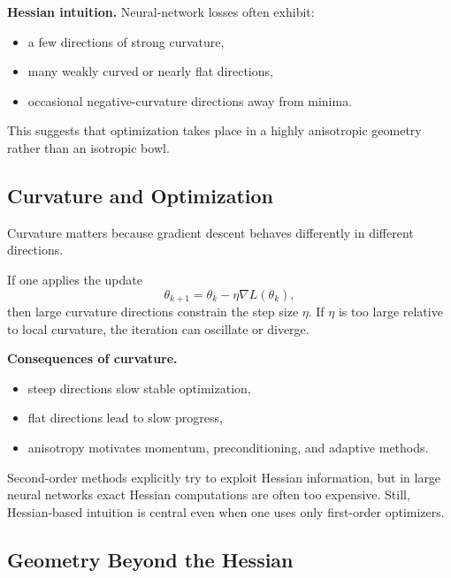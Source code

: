 \medskip

\noindent
\textbf{Hessian intuition.}
Neural-network losses often exhibit:
\begin{itemize}
    \item a few directions of strong curvature,
    \item many weakly curved or nearly flat directions,
    \item occasional negative-curvature directions away from minima.
\end{itemize}

\medskip

\noindent
This suggests that optimization takes place in a highly anisotropic geometry rather than an isotropic bowl.

\subsection{Curvature and Optimization}

Curvature matters because gradient descent behaves differently in different directions.

\medskip

\noindent
If one applies the update
\[
\theta_{k+1}=\theta_k-\eta \nabla L(\theta_k),
\]
then large curvature directions constrain the step size \(\eta\). If \(\eta\) is too large relative to local curvature, the iteration can oscillate or diverge.

\medskip

\noindent
\textbf{Consequences of curvature.}
\begin{itemize}
    \item steep directions slow stable optimization,
    \item flat directions lead to slow progress,
    \item anisotropy motivates momentum, preconditioning, and adaptive methods.
\end{itemize}

\medskip

\noindent
Second-order methods explicitly try to exploit Hessian information, but in large neural networks exact Hessian computations are often too expensive. Still, Hessian-based intuition is central even when one uses only first-order optimizers.

\subsection{Geometry Beyond the Hessian}

